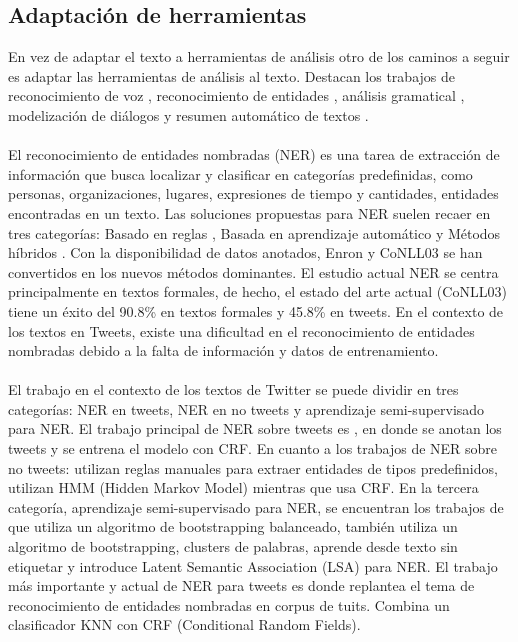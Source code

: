 \documentclass[spanish,12pt, a4paper,twoside]{paper}
\begin{document}
\subsection{Adaptación de herramientas}\label{sec:adaptaciondeherramientas}
En vez de adaptar el texto a herramientas de análisis otro de los caminos a seguir es adaptar las herramientas de análisis al texto. Destacan los trabajos de reconocimiento de voz \cite{gimpel:2011} \cite{owoputi:2013}, reconocimiento de entidades \cite{finin:2010} \cite{ritter:2011} \cite{liu:2011}, análisis gramatical \cite{foster:2011}, modelización de diálogos \cite{ritter:2010} y resumen automático de textos \cite{sharifi:2010}.\\\\

El reconocimiento de entidades nombradas (NER) es una tarea de extracción de información que busca localizar y clasificar en categorías predefinidas, como personas, organizaciones, lugares, expresiones de tiempo y cantidades, entidades encontradas en un texto. Las soluciones propuestas para NER suelen recaer en tres categorías: Basado en reglas \cite{krupkahausman:1998}, Basada en aprendizaje automático \cite{finkelmanning:2009} \cite{singh:2010} y Métodos híbridos \cite{jansche:2002}. Con la disponibilidad de datos anotados, Enron \cite{minkov:2005} y CoNLL03 \cite{tjong:2003} se han convertidos en los nuevos métodos dominantes. El estudio actual NER se centra principalmente en textos formales, de hecho, el estado del arte actual (CoNLL03) tiene un éxito del 90.8\% en textos formales y 45.8\% en tweets. En el contexto de los textos en Tweets, existe una dificultad en el reconocimiento de entidades nombradas debido a la falta de información y datos de entrenamiento.\\\\El trabajo en el contexto de los textos de Twitter se puede dividir en tres categorías: NER en tweets, NER en no tweets y aprendizaje semi-supervisado para NER. El trabajo principal de NER sobre tweets es \cite{finin:2010}, en donde se anotan los tweets y se entrena el modelo con CRF. En cuanto a los trabajos de NER sobre no tweets: \cite{krupkahausman:1998} utilizan reglas manuales para extraer entidades de tipos predefinidos, \cite{zhousu:2002} utilizan HMM (Hidden Markov Model) mientras que \cite{finkel:2005} usa CRF. En la tercera categoría, aprendizaje semi-supervisado para NER, se encuentran los trabajos de \cite{jiangzhai:2007} que utiliza un algoritmo de bootstrapping balanceado, \cite{wu:2009} también utiliza un algoritmo de bootstrapping, \cite{miller:2004} clusters de palabras, \cite{brown:1992} aprende desde texto sin etiquetar y \cite{guo:2009} introduce Latent Semantic Association (LSA) para NER. El trabajo más importante y actual de NER para tweets es \cite{liu:2011} donde replantea el tema de reconocimiento de entidades nombradas en corpus de tuits. Combina un clasificador KNN con CRF (Conditional Random Fields).\\\\
\end{document}
